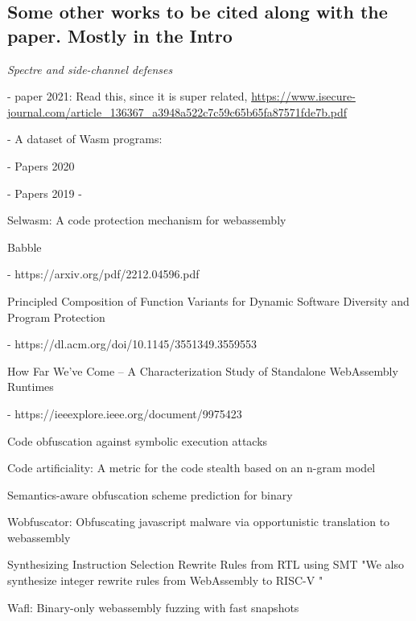 \subsection{Some other works to be cited along with the paper. Mostly in the Intro}

\emph{Spectre and side-channel defenses}

- paper 2021: Read this, since it is super related, \url{https://www.isecure-journal.com/article_136367_a3948a522c7c59c65b65fa87571fde7b.pdf} \cite{WasmSpectre}


- A dataset of Wasm programs: \cite{nicholson2023wasmizer}

- Papers 2020

- Papers 2019
- \cite{10.1145/3510003.3510070}

Selwasm: A code protection mechanism for webassembly


Babble

- https://arxiv.org/pdf/2212.04596.pdf

Principled Composition of Function Variants for Dynamic
Software Diversity and Program Protection

- https://dl.acm.org/doi/10.1145/3551349.3559553

How Far We’ve Come – A Characterization Study of Standalone WebAssembly Runtimes

- https://ieeexplore.ieee.org/document/9975423

Code obfuscation against symbolic execution attacks

Code artificiality: A metric for the code stealth based on an n-gram model

Semantics-aware obfuscation scheme prediction for binary

Wobfuscator: Obfuscating javascript malware via opportunistic translation to webassembly

Synthesizing Instruction Selection Rewrite Rules from RTL using SMT
"We also synthesize integer rewrite rules from WebAssembly to RISC-V "

Wafl: Binary-only webassembly fuzzing with fast snapshots

